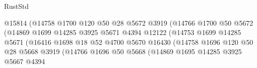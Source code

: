 \begin{lexlean}{RustStd}
\begin{coremodule}
                                          @15814
                                          (@14758
                                            @1700
                                            @120
                                            @50
                                            @28
                                            @5672
                                            @3919
                                            (@14766
                                              @1700
                                              @50
                                              @5672
                                              (@14869
                                                @1699
                                                @14285
                                                @3925
                                                @5671
                                                @4394
                                                @12122
                                                (@14753
                                                  @1699
                                                  @14285
                                                  @5671
                                                  (@16416
                                                    @1698
                                                    @18
                                                    @52
                                                    @4700
                                                    @5670
                                                    @16430
                                                    (@14758
                                                      @1696
                                                      @120
                                                      @50
                                                      @28
                                                      @5668
                                                      @3919
                                                      (@14766
                                                        @1696
                                                        @50
                                                        @5668
                                                        (@14869
                                                          @1695
                                                          @14285
                                                          @3925
                                                          @5667
                                                          @4394

\end{coremodule}
\end{lexlean}

